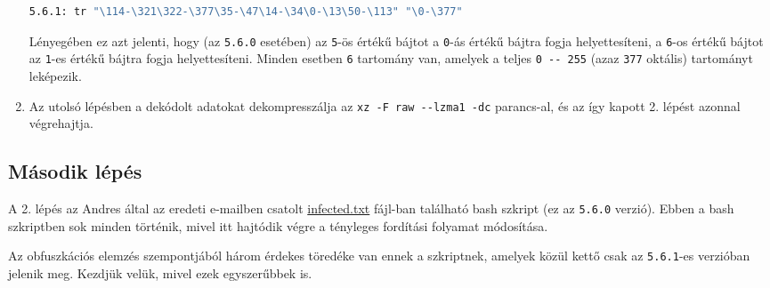 \documentclass[11pt]{article}
\begin{document}
\begin{enumerate}
\begin{lstlisting}[language=bash]
5.6.1: tr "\114-\321\322-\377\35-\47\14-\34\0-\13\50-\113" "\0-\377"
    \end{lstlisting}
    Lényegében ez azt jelenti, hogy (az \lstinline{5.6.0} esetében) az \lstinline{5}-ös értékű bájtot a \lstinline{0}-ás értékű bájtra fogja helyettesíteni, a \lstinline{6}-os értékű bájtot az \lstinline{1}-es értékű bájtra fogja helyettesíteni. Minden esetben \lstinline{6} tartomány van, amelyek a teljes \lstinline{0 -- 255} (azaz \lstinline{377} oktális) tartományt leképezik.

    \item Az utolsó lépésben a dekódolt adatokat dekompresszálja az \lstinline{xz -F raw --lzma1 -dc} parancs-al, és az így kapott 2. lépést azonnal végrehajtja.
    
\end{enumerate}

\subsection{Második lépés}
A 2. lépés az Andres által az eredeti e-mailben csatolt \href{https://www.openwall.com/lists/oss-security/2024/03/29/4/1}{infected.txt} fájl-ban található bash szkript (ez az \lstinline{5.6.0} verzió). Ebben a bash szkriptben sok minden történik, mivel itt hajtódik végre a tényleges fordítási folyamat módosítása.

Az obfuszkációs elemzés szempontjából három érdekes töredéke van ennek a szkriptnek, amelyek közül kettő csak az \lstinline{5.6.1}-es verzióban jelenik meg. Kezdjük velük, mivel ezek egyszerűbbek is.
\end{document}
